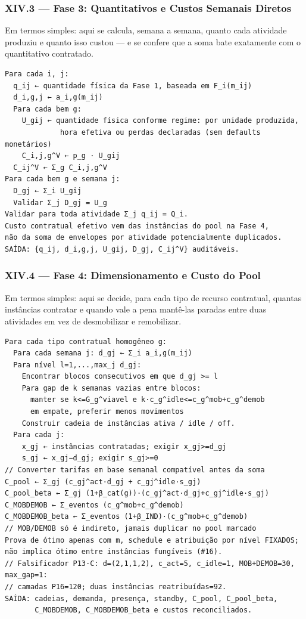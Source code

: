 \documentclass[
  10pt,
]{article}
\begin{document}
\hypertarget{xiv.3-fase-3-quantitativos-e-custos-semanais-diretos}{%
\subsubsection{XIV.3 --- Fase 3: Quantitativos e Custos Semanais
Diretos}\label{xiv.3-fase-3-quantitativos-e-custos-semanais-diretos}}

Em termos simples: aqui se calcula, semana a semana, quanto cada
atividade produziu e quanto isso custou --- e se confere que a soma bate
exatamente com o quantitativo contratado.

\begin{verbatim}
Para cada i, j:
  q_ij ← quantidade física da Fase 1, baseada em F_i(m_ij)
  d_i,g,j ← a_i,g(m_ij)
  Para cada bem g:
    U_gij ← quantidade física conforme regime: por unidade produzida,
             hora efetiva ou perdas declaradas (sem defaults monetários)
    C_i,j,g^V ← p_g · U_gij
  C_ij^V ← Σ_g C_i,j,g^V
Para cada bem g e semana j:
  D_gj ← Σ_i U_gij
  Validar Σ_j D_gj = U_g
Validar para toda atividade Σ_j q_ij = Q_i.
Custo contratual efetivo vem das instâncias do pool na Fase 4,
não da soma de envelopes por atividade potencialmente duplicados.
SAÍDA: {q_ij, d_i,g,j, U_gij, D_gj, C_ij^V} auditáveis.
\end{verbatim}

\hypertarget{xiv.4-fase-4-dimensionamento-e-custo-do-pool}{%
\subsubsection{XIV.4 --- Fase 4: Dimensionamento e Custo do
Pool}\label{xiv.4-fase-4-dimensionamento-e-custo-do-pool}}

Em termos simples: aqui se decide, para cada tipo de recurso contratual,
quantas instâncias contratar e quando vale a pena mantê-las paradas
entre duas atividades em vez de desmobilizar e remobilizar.

\begin{verbatim}
Para cada tipo contratual homogêneo g:
  Para cada semana j: d_gj ← Σ_i a_i,g(m_ij)
  Para nível l=1,...,max_j d_gj:
    Encontrar blocos consecutivos em que d_gj >= l
    Para gap de k semanas vazias entre blocos:
      manter se k<=G_g^viavel e k·c_g^idle<=c_g^mob+c_g^demob
      em empate, preferir menos movimentos
    Construir cadeia de instâncias ativa / idle / off.
  Para cada j:
    x_gj ← instâncias contratadas; exigir x_gj>=d_gj
    s_gj ← x_gj−d_gj; exigir s_gj>=0
// Converter tarifas em base semanal compatível antes da soma
C_pool ← Σ_gj (c_gj^act·d_gj + c_gj^idle·s_gj)
C_pool_beta ← Σ_gj (1+β_cat(g))·(c_gj^act·d_gj+c_gj^idle·s_gj)
C_MOBDEMOB ← Σ_eventos (c_g^mob+c_g^demob)
C_MOBDEMOB_beta ← Σ_eventos (1+β_IND)·(c_g^mob+c_g^demob)
// MOB/DEMOB só é indireto, jamais duplicar no pool marcado
Prova de ótimo apenas com m, schedule e atribuição por nível FIXADOS; não implica ótimo entre instâncias fungíveis (#16).
// Falsificador P13-C: d=(2,1,1,2), c_act=5, c_idle=1, MOB+DEMOB=30, max_gap=1:
// camadas P16=120; duas instâncias reatribuídas=92.
SAÍDA: cadeias, demanda, presença, standby, C_pool, C_pool_beta,
       C_MOBDEMOB, C_MOBDEMOB_beta e custos reconciliados.
\end{verbatim}
\end{document}
